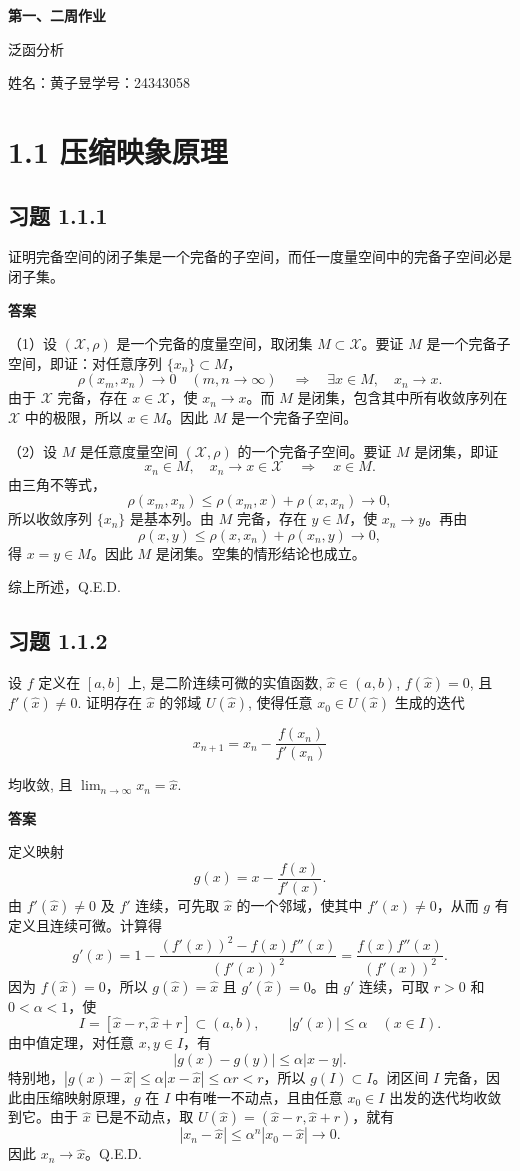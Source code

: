 \documentclass[UTF8,a4paper,11pt,fontset=fandol]{ctexart}
\newcommand{\exercise}[1]{\par\ifdim\dimexpr\pagegoal-\pagetotal\relax<7\baselineskip\newpage\fi\subsection*{习题 #1}}
\newcommand{\answer}{\par\smallskip\noindent\textbf{答案}\quad}
\newcommand{\qedherecustom}{\unskip\hfill\mbox{\normalfont Q.E.D.}\par}
\begin{document}
\begin{center}
{\LARGE\bfseries 第一、二周作业}\par\medskip
{\large 泛函分析}\par\medskip
姓名：黄子昱\qquad 学号：24343058
\end{center}
\medskip

\section*{1.1 压缩映象原理}

\exercise{1.1.1}

证明完备空间的闭子集是一个完备的子空间，而任一度量空间中的完备子空间必是闭子集。

\answer

（1）设 $(\mathcal X,\rho)$ 是一个完备的度量空间，取闭集 $M\subset\mathcal X$。要证 $M$ 是一个完备子空间，即证：对任意序列 $\{x_n\}\subset M$，
\[
\rho(x_m,x_n)\longrightarrow0\quad(m,n\to\infty)
\quad\Longrightarrow\quad
\exists x\in M,\quad x_n\longrightarrow x.
\]
由于 $\mathcal X$ 完备，存在 $x\in\mathcal X$，使 $x_n\to x$。而 $M$ 是闭集，包含其中所有收敛序列在 $\mathcal X$ 中的极限，所以 $x\in M$。因此 $M$ 是一个完备子空间。

（2）设 $M$ 是任意度量空间 $(\mathcal X,\rho)$ 的一个完备子空间。要证 $M$ 是闭集，即证
\[
x_n\in M,\quad x_n\longrightarrow x\in\mathcal X
\quad\Longrightarrow\quad x\in M.
\]
由三角不等式，
\[
\rho(x_m,x_n)\leq\rho(x_m,x)+\rho(x,x_n)\longrightarrow0,
\]
所以收敛序列 $\{x_n\}$ 是基本列。由 $M$ 完备，存在 $y\in M$，使 $x_n\to y$。再由
\[
\rho(x,y)\leq\rho(x,x_n)+\rho(x_n,y)\longrightarrow0,
\]
得 $x=y\in M$。因此 $M$ 是闭集。空集的情形结论也成立。

综上所述，\qedherecustom

\exercise{1.1.2}

设 $f$ 定义在 $[a,b]$ 上, 是二阶连续可微的实值函数, $\hat{x}\in(a,b)$, $f(\hat{x})=0$, 且 $f'(\hat{x})\ne0$. 证明存在 $\hat{x}$ 的邻域 $U(\hat{x})$, 使得任意 $x_0\in U(\hat{x})$ 生成的迭代

\[
x_{n+1}=x_n-\frac{f(x_n)}{f'(x_n)}
\]

均收敛, 且 $\lim_{n\to\infty}x_n=\hat{x}$.

\answer

定义映射
\[
g(x)=x-\frac{f(x)}{f'(x)}.
\]
由 $f'(\hat x)\ne0$ 及 $f'$ 连续，可先取 $\hat x$ 的一个邻域，使其中 $f'(x)\ne0$，从而 $g$ 有定义且连续可微。计算得
\[
g'(x)=1-\frac{(f'(x))^2-f(x)f''(x)}{(f'(x))^2}
=\frac{f(x)f''(x)}{(f'(x))^2}.
\]
因为 $f(\hat x)=0$，所以 $g(\hat x)=\hat x$ 且 $g'(\hat x)=0$。由 $g'$ 连续，可取 $r>0$ 和 $0<\alpha<1$，使
\[
I=[\hat x-r,\hat x+r]\subset(a,b),\qquad
|g'(x)|\leq\alpha\quad(x\in I).
\]
由中值定理，对任意 $x,y\in I$，有
\[
|g(x)-g(y)|\leq\alpha|x-y|.
\]
特别地，$|g(x)-\hat x|\leq\alpha|x-\hat x|\leq\alpha r<r$，所以 $g(I)\subset I$。闭区间 $I$ 完备，因此由压缩映射原理，$g$ 在 $I$ 中有唯一不动点，且由任意 $x_0\in I$ 出发的迭代均收敛到它。由于 $\hat x$ 已是不动点，取 $U(\hat x)=(\hat x-r,\hat x+r)$，就有
\[
|x_n-\hat x|\leq\alpha^n|x_0-\hat x|\longrightarrow0.
\]
因此 $x_n\to\hat x$。\qedherecustom
\end{document}
